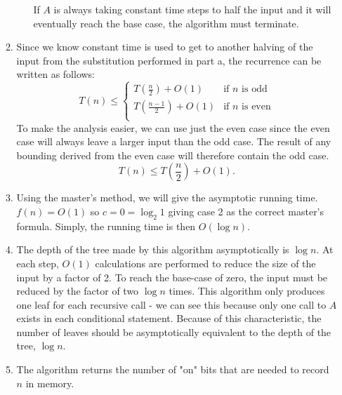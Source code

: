 \documentclass[letterpaper,11pt]{article}
\begin{document}
\begin{enumerate}
\begin{enumerate}
\begin{itemize}
                If $A$ is always taking constant time steps to half the input
                and it will eventually reach the base case, the algorithm must 
                terminate. 
            \end{itemize}
        \item Since we know constant time is used to get to another halving of 
            the input from the substitution performed in part a, the recurrence
            can be written as follows:
            \[ 
                T\left( n \right) \le 
                \begin{cases}
                    T\left( \frac{n}{2} \right) + O\left( 1 \right)  & \text{if $n$ is odd} \\
                    T\left( \frac{n-1}{2} \right) + O\left( 1 \right)  & \text{if $n$ is even} \\
                \end{cases}
            \]
            To make the analysis easier, we can use just the even case since
            the even case will always leave a larger input than the odd case. 
            The result of any bounding derived from the even case will therefore
            contain the odd case. 
            \[
                T\left( n \right) \le  T\left( \frac{n}{2} \right) + O\left( 1 \right)
            .\] 

        \item Using the master's method, we will give the asymptotic running 
            time. $f(n) = O\left( 1 \right) $ so $c = 0 = \log_{2}{1}$ giving
            case 2 as the correct master's formula. Simply, the running time 
            is then $O\left( \log{n} \right) $.

        \item The depth of the tree made by this algorithm asymptotically is 
            $\log{n}$. At each step, $O\left( 1 \right) $ calculations are 
            performed to reduce the size of the input by a factor of 2. To reach
            the base-case of zero, the input must be reduced by the factor of
            two $\log{n}$ times. This algorithm only produces one leaf for each 
            recursive call - we can see this because only one call to $A$ exists
            in each conditional statement. Because of this characteristic, the 
            number of leaves should be asymptotically equivalent to the depth 
            of the tree, $\log{n}$.

        \item The algorithm returns the number of "on" bits that are needed to 
            record $n$ in memory.


\end{enumerate}
\end{enumerate}
\end{document}
